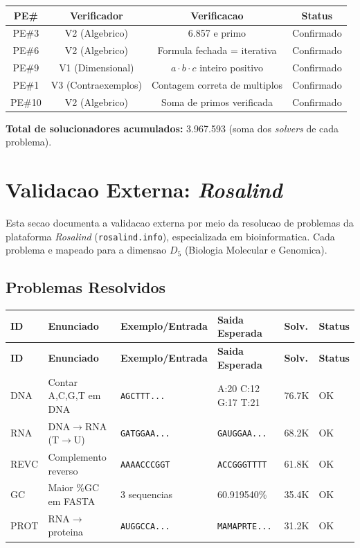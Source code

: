 \begin{center}
\begin{tabular}{|c|c|c|c|}
\hline
\textbf{PE\#} & \textbf{Verificador} & \textbf{Verificacao} & \textbf{Status} \\
\hline
PE\#3 & V2 (Algebrico) & 6.857 e primo & Confirmado \\
\hline
PE\#6 & V2 (Algebrico) & Formula fechada = iterativa & Confirmado \\
\hline
PE\#9 & V1 (Dimensional) & $a\cdot b\cdot c$ inteiro positivo & Confirmado \\
\hline
PE\#1 & V3 (Contraexemplos) & Contagem correta de multiplos & Confirmado \\
\hline
PE\#10 & V2 (Algebrico) & Soma de primos verificada & Confirmado \\
\hline
\end{tabular}
\end{center}

\textbf{Total de solucionadores acumulados:} 3.967.593 (soma dos \textit{solvers} de cada problema).

\newpage

\section{Validacao Externa: \textit{Rosalind}}

Esta secao documenta a validacao externa por meio da resolucao de problemas da plataforma \textit{Rosalind} (\texttt{rosalind.info}), especializada em bioinformatica. Cada problema e mapeado para a dimensao $D_5$ (Biologia Molecular e Genomica).

\subsection{Problemas Resolvidos}

\begin{longtable}{|p{0.8cm}|p{3.0cm}|p{3.5cm}|p{2.5cm}|p{1.0cm}|p{1.5cm}|}
\hline
\textbf{ID} & \textbf{Enunciado} & \textbf{Exemplo/Entrada} & \textbf{Saida Esperada} & \textbf{Solv.} & \textbf{Status} \\
\hline
\endfirsthead
\hline
\textbf{ID} & \textbf{Enunciado} & \textbf{Exemplo/Entrada} & \textbf{Saida Esperada} & \textbf{Solv.} & \textbf{Status} \\
\hline
\endhead
\hline
\endfoot
DNA & Contar A,C,G,T em DNA & \texttt{AGCTTT...} & A:20 C:12 G:17 T:21 & 76.7K & OK \\
\hline
RNA & DNA$\to$RNA (T$\to$U) & \texttt{GATGGAA...} & \texttt{GAUGGAA...} & 68.2K & OK \\
\hline
REVC & Complemento reverso & \texttt{AAAACCCGGT} & \texttt{ACCGGGTTTT} & 61.8K & OK \\
\hline
GC & Maior \%GC em FASTA & 3 sequencias & 60.919540\% & 35.4K & OK \\
\hline
PROT & RNA$\to$proteina & \texttt{AUGGCCA...} & \texttt{MAMAPRTE...} & 31.2K & OK \\
\hline
\end{longtable}

